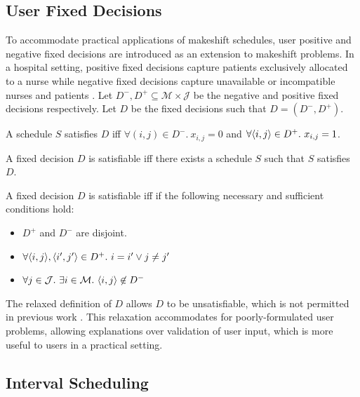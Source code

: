 \subsection{User Fixed Decisions}

To accommodate practical applications of makeshift schedules, user positive and negative fixed decisions are introduced as an extension to makeshift problems. In a hospital setting, positive fixed decisions capture patients exclusively allocated to a nurse while negative fixed decisions capture unavailable or incompatible nurses and patients \cite{aes}. Let $D^-,D^+\subseteq\mathcal{M}\times\mathcal{J}$ be the negative and positive fixed decisions respectively. Let $D$ be the fixed decisions such that $D=(D^-,D^+)$.

\begin{definition}
	A schedule $S$ satisfies $D$ iff $\forall(i,j)\in D^-.\ x_{i,j}=0$ and $\forall \pair{i}{j}\in D^+.\ x_{i,j}=1$.
\end{definition}

\begin{definition}
	A fixed decision $D$ is satisfiable iff there exists a schedule $S$ such that $S$ satisfies $D$. 
\end{definition}

\begin{theorem}
	A fixed decision $D$ is satisfiable iff if the following necessary and sufficient conditions hold:
	\begin{itemize}
		\item$D^+$ and $D^-$ are disjoint.
		\item$\forall\langle{i},{j}\rangle,\langle{i'},{j'}\rangle\in D^+.\ i=i'\lor j\neq j'$
		\item$\forall j\in\mathcal{J}.\ \exists i\in\mathcal{M}.\ \langle{i},{j}\rangle\not\in D^-$
	\end{itemize}
\end{theorem}

The relaxed definition of $D$ allows $D$ to be unsatisfiable, which is not permitted in previous work \cite{aes}. This relaxation accommodates for poorly-formulated user problems, allowing explanations over validation of user input, which is more useful to users in a practical setting.

\subsection{Interval Scheduling}

